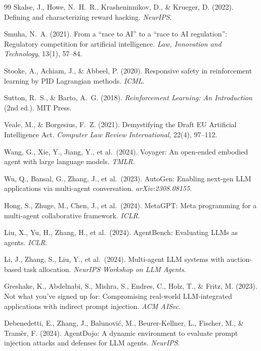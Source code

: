 \documentclass[11pt,a4paper]{article}
\theoremstyle{remark}
\begin{document}
\begin{thebibliography}{99}
Skalse, J., Howe, N.~H.~R., Krasheninnikov, D., \& Krueger, D. (2022). Defining and characterizing reward hacking. \textit{NeurIPS}.

Smuha, N.~A. (2021). From a ``race to AI'' to a ``race to AI regulation'': Regulatory competition for artificial intelligence. \textit{Law, Innovation and Technology}, 13(1), 57--84.

Stooke, A., Achiam, J., \& Abbeel, P. (2020). Responsive safety in reinforcement learning by PID Lagrangian methods. \textit{ICML}.

Sutton, R.~S., \& Barto, A.~G. (2018). \textit{Reinforcement Learning: An Introduction} (2nd ed.). MIT Press.

Veale, M., \& Borgesius, F.~Z. (2021). Demystifying the Draft EU Artificial Intelligence Act. \textit{Computer Law Review International}, 22(4), 97--112.

Wang, G., Xie, Y., Jiang, Y., et al.\ (2024). Voyager: An open-ended embodied agent with large language models. \textit{TMLR}.

Wu, Q., Bansal, G., Zhang, J., et al.\ (2023). AutoGen: Enabling next-gen LLM applications via multi-agent conversation. \textit{arXiv:2308.08155}.

Hong, S., Zhuge, M., Chen, J., et al.\ (2024). MetaGPT: Meta programming for a multi-agent collaborative framework. \textit{ICLR}.

Liu, X., Yu, H., Zhang, H., et al.\ (2024). AgentBench: Evaluating LLMs as agents. \textit{ICLR}.

Li, J., Zhang, S., Liu, Y., et al.\ (2024). Multi-agent LLM systems with auction-based task allocation. \textit{NeurIPS Workshop on LLM Agents}.

Greshake, K., Abdelnabi, S., Mishra, S., Endres, C., Holz, T., \& Fritz, M. (2023). Not what you've signed up for: Compromising real-world LLM-integrated applications with indirect prompt injection. \textit{ACM AISec}.

Debenedetti, E., Zhang, J., Balunovi\'c, M., Beurer-Kellner, L., Fischer, M., \& Tramèr, F. (2024). AgentDojo: A dynamic environment to evaluate prompt injection attacks and defenses for LLM agents. \textit{NeurIPS}.


\end{thebibliography}
\end{document}
